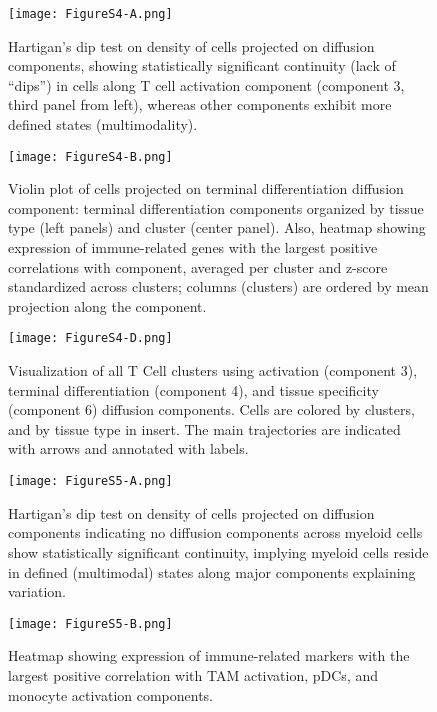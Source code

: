 \begin{figure}
\centering
\texttt{[image: FigureS4-A.png]}
\caption{Hartigan’s dip test on density of cells projected on diffusion components, showing statistically significant continuity (lack of “dips”) in cells along T cell activation component (component 3, third panel from left), whereas other components exhibit more defined states (multimodality).
}
\label{fig:s4a}
\end{figure}

\begin{figure}
\centering
\texttt{[image: FigureS4-B.png]}
\caption{Violin plot of cells projected on terminal differentiation diffusion component: terminal differentiation components organized by tissue type (left panels) and cluster (center panel). Also, heatmap showing expression of immune-related genes with the largest positive correlations with component, averaged per cluster and z-score standardized across clusters; columns (clusters) are ordered by mean projection along the component.
}
\label{fig:s4b}
\end{figure}

\begin{figure}
\centering
\texttt{[image: FigureS4-D.png]}
\caption{Visualization of all T Cell clusters using activation (component 3), terminal differentiation (component 4), and tissue specificity (component 6) diffusion components. Cells are colored by clusters, and by tissue type in insert. The main trajectories are indicated with arrows and annotated with labels.
}
\label{fig:s4d}
\end{figure}


\begin{figure}
\centering
\texttt{[image: FigureS5-A.png]}
\caption{Hartigan’s dip test on density of cells projected on diffusion components indicating no diffusion components across myeloid cells show statistically significant continuity, implying myeloid cells reside in defined (multimodal) states along major components explaining variation.
}
\label{fig:s5a}
\end{figure}

\begin{figure}
\centering
\texttt{[image: FigureS5-B.png]}
\caption{Heatmap showing expression of immune-related markers with the largest positive correlation with TAM activation, pDCs, and monocyte activation components.
}
\label{fig:s5b}
\end{figure}

